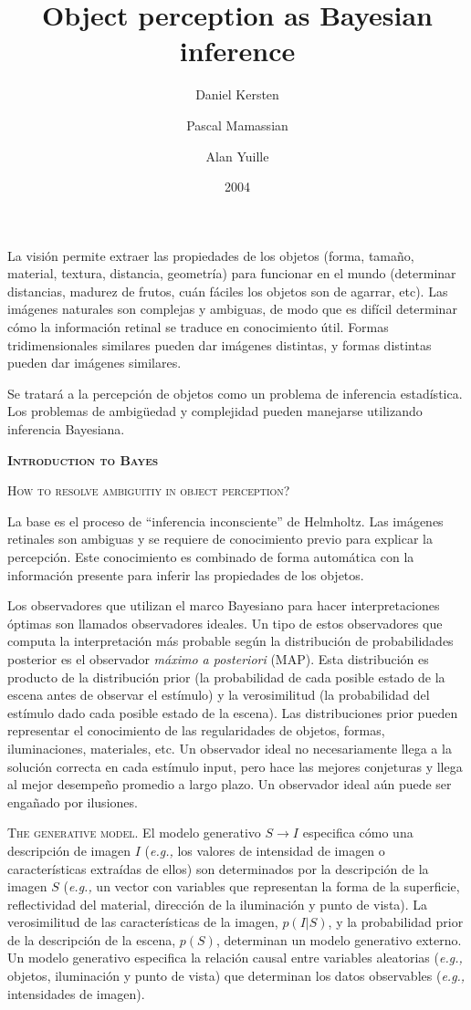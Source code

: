 \documentclass[a4paper,12pt]{article}
\title{Object perception as Bayesian inference}
\author{Daniel Kersten \and Pascal Mamassian \and Alan Yuille}
\date{2004}
\begin{document}
{\scshape\bfseries \maketitle}

La visión permite extraer las propiedades de los objetos (forma, tamaño, material, textura, distancia, geometría) para funcionar en el mundo (determinar distancias, madurez de frutos, cuán fáciles los objetos son de agarrar, etc). Las imágenes naturales son complejas y ambiguas, de modo que es difícil determinar cómo la información retinal se traduce en conocimiento útil. Formas tridimensionales similares pueden dar imágenes distintas, y formas distintas pueden dar imágenes similares.

Se tratará a la percepción de objetos como un problema de inferencia estadística. Los problemas de ambigüedad y complejidad pueden manejarse utilizando inferencia Bayesiana. 

{\scshape\bfseries Introduction to Bayes}

{\scshape How to resolve ambiguitiy in object perception?}

La base es el proceso de ``inferencia inconsciente'' de Helmholtz. Las imágenes retinales son ambiguas y se requiere de conocimiento previo para explicar la percepción. Este conocimiento es combinado de forma automática con la información presente para inferir las propiedades de los objetos.

Los observadores que utilizan el marco Bayesiano para hacer interpretaciones óptimas son llamados observadores ideales. Un tipo de estos observadores que computa la interpretación más probable según la distribución de probabilidades posterior es el observador {\itshape máximo a posteriori} (MAP). Esta distribución es producto de la distribución prior (la probabilidad de cada posible estado de la escena antes de observar el estímulo) y la verosimilitud (la probabilidad del estímulo dado cada posible estado de la escena). Las distribuciones prior pueden representar el conocimiento de las regularidades de objetos, formas, iluminaciones, materiales, etc. Un observador ideal no necesariamente llega a la solución correcta en cada estímulo input, pero hace las mejores conjeturas y llega al mejor desempeño promedio a largo plazo. Un observador ideal aún puede ser engañado por ilusiones.

{\scshape The generative model.} El modelo generativo $S \rightarrow I$ especifica cómo una descripción de imagen $I$ ({\itshape e.g.,} los valores de intensidad de imagen o características extraídas de ellos) son determinados por la descripción de la imagen $S$ ({\itshape e.g.,} un vector con variables que representan la forma de la superficie, reflectividad del material, dirección de la iluminación y punto de vista). La verosimilitud de las características de la imagen, $p(I|S)$, y la probabilidad prior de la descripción de la escena, $p(S)$, determinan un modelo generativo externo. Un modelo generativo especifica la relación causal entre variables aleatorias ({\itshape e.g.,} objetos, iluminación y punto de vista) que determinan los datos observables ({\itshape e.g.,} intensidades de imagen).
\end{document}
